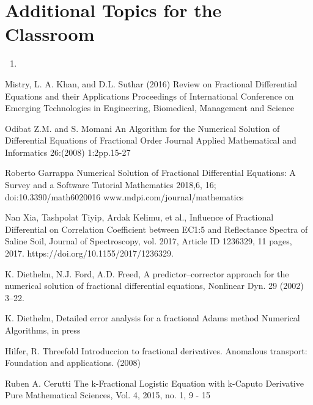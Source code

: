 \section{Additional Topics for the Classroom}

\begin{enumerate}
\item 
\end{enumerate}



\begin{thebibliography}{00}

 Mistry, L. A. Khan, and D.L. Suthar (2016)
\newblock Review on Fractional Differential Equations and their Applications
\newblock Proceedings of International Conference on Emerging Technologies in Engineering, Biomedical, Management and Science 

 Odibat Z.M. and S. Momani
\newblock An Algorithm for the Numerical Solution of Differential Equations of Fractional Order
\newblock Journal Applied Mathematical and Informatics 26:(2008) 1:2pp.15-27

 Roberto Garrappa
\newblock Numerical Solution of Fractional Differential Equations: A Survey and a Software Tutorial
\newblock Mathematics 2018,6, 16; doi:10.3390/math6020016 www.mdpi.com/journal/mathematics

 Nan Xia, Tashpolat Tiyip, Ardak Kelimu, et al., 
\newblock Influence of Fractional Differential on Correlation Coefficient between EC1:5 and Reflectance Spectra of Saline Soil,
\newblock Journal of Spectroscopy, vol. 2017, Article ID 1236329, 11 pages, 2017. https://doi.org/10.1155/2017/1236329.

K. Diethelm, N.J. Ford, A.D. Freed, 
\newblock A predictor–corrector approach for the numerical solution of fractional differential equations, 
\newblock Nonlinear Dyn. 29 (2002) 3–22.
 
 K. Diethelm, 
\newblock Detailed error analysis for a fractional Adams method
\newblock Numerical Algorithms, in press

 Hilfer,  R.
\newblock Threefold  Introduccion  to  fractional  derivatives.  
\newblock Anomalous transport:  Foundation and applications. (2008)

 Ruben A. Cerutti
\newblock The k-Fractional Logistic Equation with k-Caputo Derivative
\newblock Pure Mathematical Sciences, Vol.  4, 2015, no.  1, 9 - 15


\end{thebibliography}
